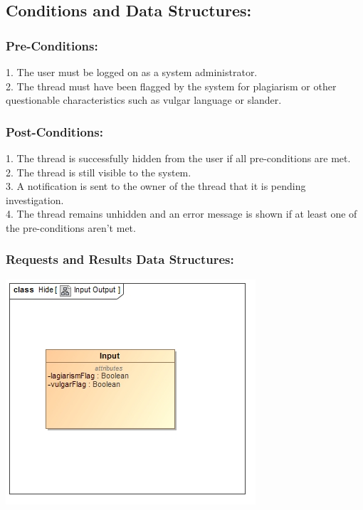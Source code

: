 \documentclass[a4paper,11pt]{article}
\begin{document}
\subsection{Conditions and Data Structures:}
\subsubsection*{Pre-Conditions:}
1.	The user must be logged on as a system administrator.\\
2.	The thread must have been flagged by the system for plagiarism or other questionable characteristics such as vulgar language or slander.\\
\subsubsection*{Post-Conditions:}
1.	The thread is successfully hidden from the user if all pre-conditions are met.\\
2.	The thread is still visible to the system.\\
3.	A notification is sent to the owner of the thread that it is pending investigation.\\
4.	The thread remains unhidden and an error message is shown if at least one of the pre-conditions aren't met.\\
\subsubsection*{Requests and Results Data Structures:}
\includegraphics{Images/SCHMThread/HideInOut.jpg}\\
\end{document}
